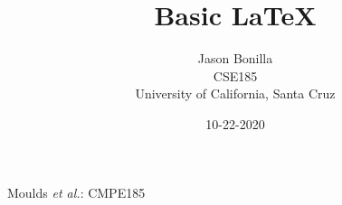 \documentclass[12pt,journal,compsoc]{IEEEtran}
\begin{document}

\title{Basic \LaTeX{}}
\author{Jason Bonilla\\
		CSE185 \\
		University of California, Santa Cruz \\
		\date{10-22-2020}
		}

\date{}		%

%
{Moulds \MakeLowercase{\textit{et al.}}: CMPE185}
% 

\end{document}
